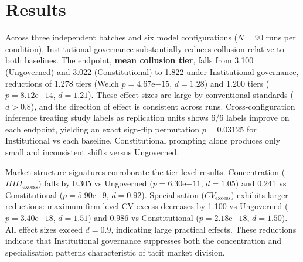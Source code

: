 \documentclass[11pt, a4paper]{article}
\begin{document}
\section{Results}
\label{sec:results}

Across three independent batches and six model configurations ($N=90$ runs per condition), Institutional governance substantially reduces collusion relative to both baselines. The endpoint, \textbf{mean collusion tier}, falls from 3.100 (Ungoverned) and 3.022 (Constitutional) to 1.822 under Institutional governance, reductions of 1.278 tiers (Welch $p=4.67\mathrm{e}{-15}$, $d=1.28$) and 1.200 tiers ($p=8.12\mathrm{e}{-14}$, $d=1.21$). These effect sizes are large by conventional standards ($d > 0.8$), and the direction of effect is consistent across runs. Cross-configuration inference treating study labels as replication units shows 6/6 labels improve on each endpoint, yielding an exact sign-flip permutation $p=0.03125$ for Institutional vs each baseline. Constitutional prompting alone produces only small and inconsistent shifts versus Ungoverned.

Market-structure signatures corroborate the tier-level results. Concentration ($HHI_{\mathrm{excess}}$) falls by 0.305 vs Ungoverned ($p=6.30\mathrm{e}{-11}$, $d=1.05$) and 0.241 vs Constitutional ($p=5.90\mathrm{e}{-9}$, $d=0.92$). Specialisation ($CV_{\mathrm{excess}}$) exhibits larger reductions: maximum firm-level CV excess decreases by 1.100 vs Ungoverned ($p=3.40\mathrm{e}{-18}$, $d=1.51$) and 0.986 vs Constitutional ($p=2.18\mathrm{e}{-18}$, $d=1.50$). All effect sizes exceed $d=0.9$, indicating large practical effects. These reductions indicate that Institutional governance suppresses both the concentration and specialisation patterns characteristic of tacit market division.

\vspace{1em}
\end{document}

